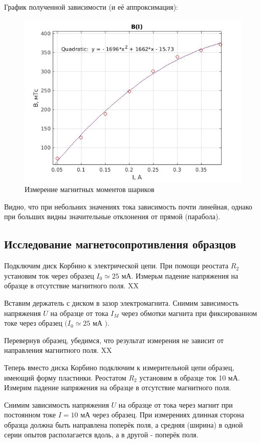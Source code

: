 \documentclass[a4paper, 12pt]{article}%
\begin{document}
График полученной зависимости (и её аппроксимация):

\begin{center}
\begin{figure}[h]
    \centering
    \includegraphics[width = 10 cm]{B(I).jpg}
    \caption{Измерение магнитных моментов шариков}
    \label{msh1}
\end{figure}
\end{center}

Видно, что при небольних значениях тока зависимость почти линейная, однако при больших видны значительные отклонения от прямой (парабола).


\subsection{Исследование магнетосопротивления образцов}

Подключим диск Корбино к электрической цепи. При помощи реостата $R_{2}$ установим ток через образец $I_{0} \simeq 25$ мА. Измерьм падение напряжения на образце в отсутствие магнитного поля. XX

Вставим держатель с диском в зазор электромагнита. Снимим зависимость напряжения $U$ на образце от тока $I_{M}$ через обмотки магнита при фиксированном токе через образец $(I_{0} \simeq 25$ мА $) .$


Перевернув образец, убедимся, что результат измерения не зависит от направления магнитного поля. XX


Теперь  вместо диска Корбино подключим к измерительной цепи образец, имеющий форму пластинки. Реостатом $R_{2}$ установим в образце ток 10 мА. Измерим падение напряжения на образце в отсутствие магнитного поля.


Снимим зависимость напряжения $U$ на образце от тока через магнит при постоянном токе $I=10$ мА через образец. При измерениях длинная сторона образца должна быть направлена поперёк поля, а средняя (ширина) в одной серии опытов располагается вдоль, а в другой - поперёк поля.
\end{document}
